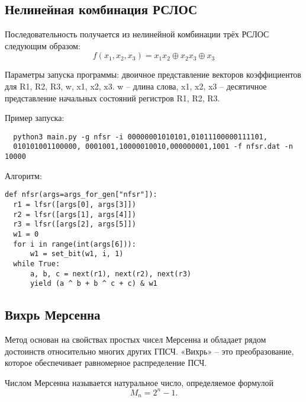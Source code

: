 \documentclass[spec, och, labwork]{shiza}
\begin{document}
\subsection{Нелинейная комбинация РСЛОС}

Последовательность получается из нелинейной комбинации трёх РСЛОС следующим образом:
\begin{equation}
  f(x_1, x_2, x_3) = x_1 x_2 \oplus x_2 x_3 \oplus x_3
\end{equation}


Параметры запуска программы: двоичное представление векторов коэффициентов
для R1, R2, R3, w, x1, x2, x3. w – длина слова, x1, x2, x3 – десятичное представление
начальных состояний регистров R1, R2, R3.

Пример запуска:
\begin{small}
\begin{verbatim}
  python3 main.py -g nfsr -i 00000001010101,01011100000111101,
  010101001100000, 0001001,10000010010,000000001,1001 -f nfsr.dat -n 10000
\end{verbatim}
\end{small}

Алгоритм:
\begin{small}
\begin{verbatim}
def nfsr(args=args_for_gen["nfsr"]):
  r1 = lfsr([args[0], args[3]])
  r2 = lfsr([args[1], args[4]])
  r3 = lfsr([args[2], args[5]])
  w1 = 0
  for i in range(int(args[6])):
      w1 = set_bit(w1, i, 1)
  while True:
      a, b, c = next(r1), next(r2), next(r3)
      yield (a ^ b + b ^ c + c) & w1
\end{verbatim}
\end{small}



\subsection{Вихрь Мерсенна}

Метод основан на свойствах простых чисел Мерсенна и обладает рядом
достоинств относительно многих других ГПСЧ. «Вихрь» – это преобразование, которое обеспечивает
равномерное распределение ПСЧ.

Числом Мерсенна называется натуральное число, определяемое формулой
\begin{equation}
  M_n = 2^n - 1.
\end{equation}
\end{document}

